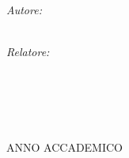 \begin{titlepage}
\begin{center}
    \begin{minipage}[t]{0.49\textwidth}
    \begin{flushleft} \large
    \emph{Autore:}\\
    \spacedlowsmallcaps{\myName}\\
    \spacedlowsmallcaps{\myMatricola}
    \end{flushleft}
    \end{minipage}
    \begin{minipage}[t]{0.49\textwidth}
    \begin{flushright} \large
    \emph{Relatore:} \\
    \spacedlowsmallcaps{\myRelator}\\
    \spacedlowsmallcaps{\myRelCourse}
    \end{flushright}
    \end{minipage}\\[0.5cm]
    \begin{minipage}[t]{0.99\textwidth}
    \begin{flushright} \large
    \end{flushright}
    \end{minipage}\\

    \vfill

    ANNO ACCADEMICO \myAA

  \end{center}
\end{titlepage}
